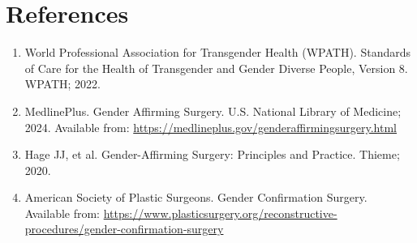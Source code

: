 \section*{References}
\begin{enumerate}
  \item World Professional Association for Transgender Health (WPATH). Standards of Care for the Health of Transgender and Gender Diverse People, Version 8. WPATH; 2022.
  \item MedlinePlus. Gender Affirming Surgery. U.S. National Library of Medicine; 2024. Available from: \url{https://medlineplus.gov/genderaffirmingsurgery.html}
  \item Hage JJ, et al. Gender-Affirming Surgery: Principles and Practice. Thieme; 2020.
  \item American Society of Plastic Surgeons. Gender Confirmation Surgery. Available from: \url{https://www.plasticsurgery.org/reconstructive-procedures/gender-confirmation-surgery}
\end{enumerate}

\clearpage
